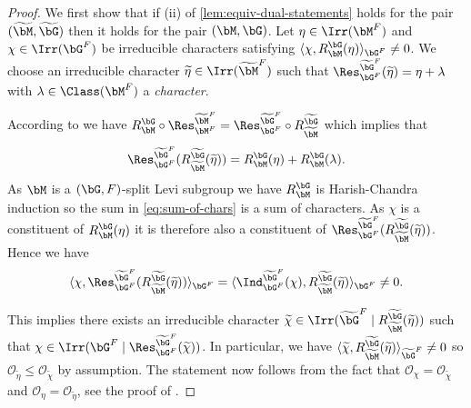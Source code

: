 \documentclass[eqthmnum,nocolour,skinny]{jt-calcs}
\begin{document}
\begin{proof}
We first show that if (ii) of \cref{lem:equiv-dual-statements} holds for the pair $(\widetilde{\bM},\widetilde{\bG})$ then it holds for the pair $(\bM,\bG)$. Let $\eta \in \Irr(\bM^F)$ and $\chi \in \Irr(\bG^F)$ be irreducible characters satisfying $\langle \chi, R_{\bM}^{\bG}(\eta)\rangle_{\bG^F} \neq 0$. We choose an irreducible character $\widetilde{\eta} \in \Irr(\widetilde{\bM}^F)$ such that $\Res_{\bG^F}^{\widetilde{\bG}^F}(\widetilde{\eta}) = \eta + \lambda$ with $\lambda \in \Class(\bM^F)$ a \emph{character}.

According to \cite[10.10]{bonnafe:2006:sln} we have $R_{\bM}^{\bG}\circ \Res_{\bM^F}^{\widetilde{\bM}^F} = \Res_{\bG^F}^{\widetilde{\bG}^F} \circ R_{\widetilde{\bM}}^{\widetilde{\bG}}$ which implies that
\begin{equation}\label{eq:sum-of-chars}
\Res_{\bG^F}^{\widetilde{\bG}^F}(R_{\widetilde{\bM}}^{\widetilde{\bG}}(\widetilde{\eta})) = R_{\bM}^{\bG}(\eta) + R_{\bM}^{\bG}(\lambda).
\end{equation}
As $\bM$ is a $(\bG,F)$-split Levi subgroup we have $R_{\bM}^{\bG}$ is Harish-Chandra induction so the sum in \cref{eq:sum-of-chars} is a sum of characters. As $\chi$ is a constituent of $R_{\bM}^{\bG}(\eta)$ it is therefore also a constituent of $\Res_{\bG^F}^{\widetilde{\bG}^F}(R_{\widetilde{\bM}}^{\widetilde{\bG}}(\widetilde{\eta}))$. Hence we have
\begin{equation*}
\langle \chi, \Res_{\bG^F}^{\widetilde{\bG}^F}(R_{\widetilde{\bM}}^{\widetilde{\bG}}(\widetilde{\eta}))\rangle_{\bG^F} = \langle \Ind_{\bG^F}^{\widetilde{\bG}^F}(\chi), R_{\widetilde{\bM}}^{\widetilde{\bG}}(\widetilde{\eta})\rangle_{\bG^F} \neq 0.
\end{equation*}

This implies there exists an irreducible character $\widetilde{\chi} \in \Irr(\widetilde{\bG}^F \mid R_{\widetilde{\bM}}^{\widetilde{\bG}}(\widetilde{\eta}))$ such that $\chi \in \Irr(\bG^F \mid \Res_{\bG^F}^{\widetilde{\bG}^F}(\widetilde{\chi}))$. In particular, we have $\langle \widetilde{\chi},R_{\widetilde{\bM}}^{\widetilde{\bG}}(\widetilde{\eta})\rangle_{\widetilde{\bG}^F} \neq 0$ so $\mathcal{O}_{\widetilde{\eta}} \leqslant \mathcal{O}_{\widetilde{\chi}}$ by assumption. The statement now follows from the fact that $\mathcal{O}_{\chi} = \mathcal{O}_{\widetilde{\chi}}$ and $\mathcal{O}_{\eta} = \mathcal{O}_{\widetilde{\eta}}$, see the proof of \cite[Lem.~5.1]{geck:1996:on-the-average-values}.


\end{proof}
\end{document}
